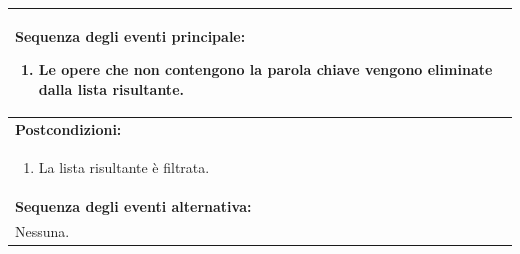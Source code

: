 \documentclass{article}
\begin{document}
\begin{table}[H]
\begin{tabular}{|p{\linewidth}|}
                        \hline
                        \textbf{Sequenza degli eventi principale:}
                        \begin{enumerate}
                            \item Le opere che non contengono la parola chiave vengono eliminate dalla lista risultante.
                        \end{enumerate} \\
                        \hline
                        \cellcolor{gray!20}
                        \textbf{Postcondizioni:} \\
                        \cellcolor{gray!20}
                        \begin{minipage}{\linewidth}
                            \begin{enumerate}
                                \item La lista risultante è filtrata.
                            \end{enumerate}
                        \end{minipage} \\
                        \hline
                        \textbf{Sequenza degli eventi alternativa:} \\
                        Nessuna. \\
                        \hline
                    \end{tabular}
                \end{table}
\end{document}

